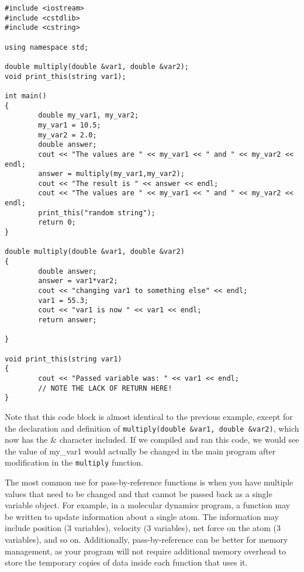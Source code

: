 \begin{verbatim}
#include <iostream>
#include <cstdlib>
#include <cstring>

using namespace std;

double multiply(double &var1, double &var2);
void print_this(string var1);

int main()
{
        double my_var1, my_var2;
        my_var1 = 10.5;
        my_var2 = 2.0;
        double answer;
        cout << "The values are " << my_var1 << " and " << my_var2 << endl;
        answer = multiply(my_var1,my_var2);
        cout << "The result is " << answer << endl;
        cout << "The values are " << my_var1 << " and " << my_var2 << endl;
        print_this("random string");
        return 0;
}

double multiply(double &var1, double &var2)
{
        double answer;
        answer = var1*var2;
        cout << "changing var1 to something else" << endl;
        var1 = 55.3;
        cout << "var1 is now " << var1 << endl;
        return answer;

}

void print_this(string var1)
{
        cout << "Passed variable was: " << var1 << endl;
        // NOTE THE LACK OF RETURN HERE!
}
\end{verbatim}

Note that this code block is almost identical to the previous example, except for the declaration and definition of \texttt{multiply(double \&var1, double \&var2)}, which now has the \& character included.  If we compiled and ran this code, we would see the value of my\_var1 would actually be changed in the main program after modification in the \texttt{multiply} function.

The most common use for pass-by-reference functions is when you have multiple values that need to be changed and that cannot be passed back as a single variable object.  For example, in a molecular dynamics program, a function may be written to update information about a single atom.  The information may include position (3 variables), velocity (3 variables), net force on the atom (3 variables), and so on.  Additionally, pass-by-reference can be better for memory management, as your program will not require additional memory overhead to store the temporary copies of data inside each function that uses it.

